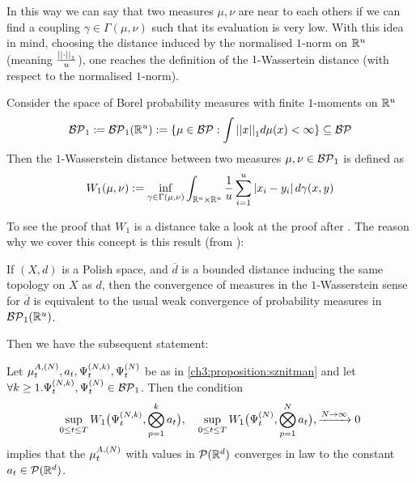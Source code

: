 In this way we can say that two measures $\mu,\nu$ are near to each others if we can find a coupling $\gamma \in \Gamma(\mu,\nu)$ such that its evaluation is very low.
With this idea in mind, choosing the distance induced by the normalised $1$-norm on $\R^u$ (meaning $\frac{\Normp{1}{\cdot}}{u}$), one reaches the definition of the $1$-Wassertein distance (with respect to the normalised $1$-norm).

\begin{definition}
	Consider the space of Borel probability measures with finite $1$-moments on $\R^u$
	\begin{equation}
		\BorelPrbMeas_1 := \BorelPrbMeas_1(\R^u) := 
		\{\mu \in \BorelPrbMeas :
		\int \Normp{1}{x} d \mu (x) < \infty
		\} \subseteq \BorelPrbMeas
	\end{equation}
	Then the $1$-Wasserstein distance between two measures $\mu,\nu \in \BorelPrbMeas_1$ is defined as
	\begin{equation}
		W_1(\mu,\nu):= \inf_{\gamma \in \Gamma(\mu,\nu)}
		\int_{\R^u \times \R^u} \frac{1}{u}\sum_{i=1}^{u} \abs{x_i-y_i} d\gamma(x,y)
	\end{equation}
\end{definition}

To see the proof that $W_1$ is a distance take a look at the proof after \autocite[Example 6.3]{cedric-villani-opt-trans}.
The reason why we cover this concept is this result (from \autocite[Corollary 6.13]{cedric-villani-opt-trans}):

\begin{theorem}
	If $(X,d)$ is a Polish space, and $\overline{d}$ is a bounded distance inducing the same topology on $X$ as $d$, then the convergence of measures in the $1$-Wasserstein sense for $\overline{d}$ is equivalent to the usual weak convergence of probability measures in $\BorelPrbMeas_1(\R^u)$.
\end{theorem}

Then we have the subsequent statement:

\begin{lemma}\label{ch3:lemma-sznitman-wasserstein}
	Let $\empmeas_t^{\amba,(N)},\adens_t, \Psi_t^{(N,k)},\Psi_t^{(N)}$ be as in \ref{ch3:proposition:sznitman} and let $\forall k\geq 1. \Psi_t^{(N,k)},\Psi_t^{(N)} \in \BorelPrbMeas_1$.
	Then the condition
	\begin{equation}\label{ch3:w-1-convergence-condition}
		\sup_{0\leq t\leq T}
		W_1 \big(
		\Psi_t^{(N,k)}, \bigotimes_{p=1}^{k}\adens_t
		\big),
		\quad
		\sup_{0\leq t\leq T}
		W_1 \big(
		\Psi_t^{(N)}, \bigotimes_{p=1}^{N}\adens_t
		\big),
		\xrightarrow {N \rightarrow \infty} 0
	\end{equation}
	implies that the \rv $\empmeas_t^{\amba,(N)}$ with values in $\PrbMeas(\R^d)$ converges in law to the constant \rv $\adens_t \in \PrbMeas(\R^d)$.
\end{lemma}

